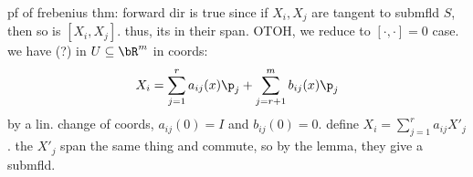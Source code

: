 pf of frebenius thm: forward dir is true since if $X_{i},X_{j}$ are
tangent to submfld $S$, then so is $[X_{i},X_{j}]$.
thus, its in their span.
OTOH, we reduce to $[\cdot,\cdot]=0$ case.
we have (?) in $U\subseteq\bR^{m}$ in coords:
\begin{equation*}
	X_{i}=\sum_{j=1}^{r}a_{ij}(x)\p_{j}+\sum_{j=r+1}^{m}b_{ij}(x)\p_{j}
\end{equation*}
by a lin. change of coords, $a_{ij}(0)=I$ and $b_{ij}(0)=0$.
define $X_{i}=\sum_{j=1}^{r}a_{ij}X'_{j}$.
the $X'_{j}$ span the same thing and commute, so by the lemma,
they give a submfld.
